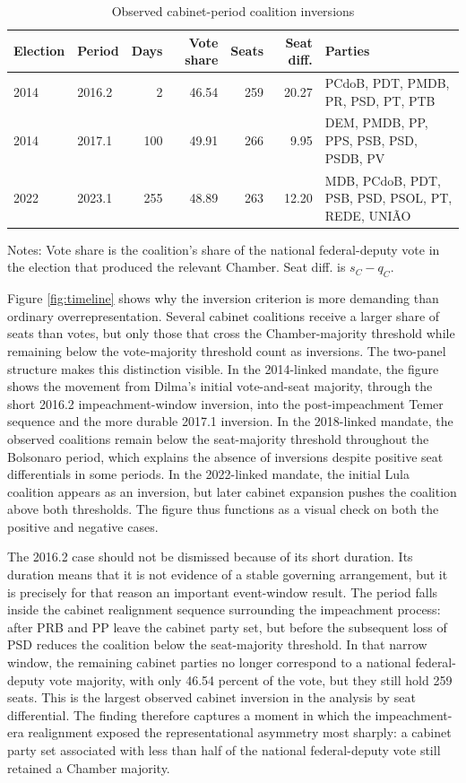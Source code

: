 \documentclass[11pt]{article}
\begin{document}
\begin{table}[htbp]
\centering
\caption{Observed cabinet-period coalition inversions}
\label{tab:cabinet-inversions}
\small
\begin{tabularx}{\textwidth}{llrrrrX}
\toprule
Election & Period & Days & Vote share & Seats & Seat diff. & Parties \\
\midrule
2014 & 2016.2 & 2 & 46.54 & 259 & 20.27 & PCdoB, PDT, PMDB, PR, PSD, PT, PTB \\
2014 & 2017.1 & 100 & 49.91 & 266 & 9.95 & DEM, PMDB, PP, PPS, PSB, PSD, PSDB, PV \\
2022 & 2023.1 & 255 & 48.89 & 263 & 12.20 & MDB, PCdoB, PDT, PSB, PSD, PSOL, PT, REDE, UNIÃO \\
\bottomrule
\end{tabularx}
\begin{flushleft}
\footnotesize Notes: Vote share is the coalition's share of the national federal-deputy vote in the election that produced the relevant Chamber. Seat diff. is $s_C-q_C$. 
\end{flushleft}
\end{table}

Figure \ref{fig:timeline} shows why the inversion criterion is more demanding than ordinary overrepresentation. Several cabinet coalitions receive a larger share of seats than votes, but only those that cross the Chamber-majority threshold while remaining below the vote-majority threshold count as inversions. The two-panel structure makes this distinction visible. In the 2014-linked mandate, the figure shows the movement from Dilma’s initial vote-and-seat majority, through the short 2016.2 impeachment-window inversion, into the post-impeachment Temer sequence and the more durable 2017.1 inversion. In the 2018-linked mandate, the observed coalitions remain below the seat-majority threshold throughout the Bolsonaro period, which explains the absence of inversions despite positive seat differentials in some periods. In the 2022-linked mandate, the initial Lula coalition appears as an inversion, but later cabinet expansion pushes the coalition above both thresholds. The figure thus functions as a visual check on both the positive and negative cases.

The 2016.2 case should not be dismissed because of its short duration. Its
duration means that it is not evidence of a stable governing arrangement, but it
is precisely for that reason an important event-window result. The period falls
inside the cabinet realignment sequence surrounding the impeachment process:
after PRB and PP leave the cabinet party set, but before the subsequent loss of
PSD reduces the coalition below the seat-majority threshold. In that narrow
window, the remaining cabinet parties no longer correspond to a national
federal-deputy vote majority, with only 46.54 percent of the vote, but they still
hold 259 seats. This is the largest observed cabinet inversion in the analysis by
seat differential. The finding therefore captures a moment in which the
impeachment-era realignment exposed the representational asymmetry most
sharply: a cabinet party set associated with less than half of the national
federal-deputy vote still retained a Chamber majority.
\end{document}
